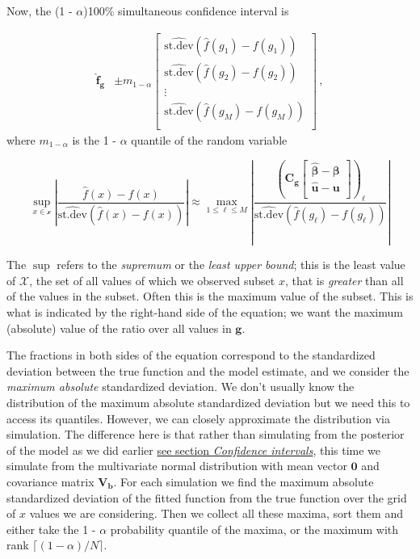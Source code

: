 \documentclass[12pt,]{article}
\begin{document}
Now, the (1 - \(\alpha\))100\% simultaneous confidence interval is

\[
\begin{aligned}
    \hat{\mathbf{f}}_{\mathbf{g}} &\pm m_{1 - \alpha} \begin{bmatrix}
           \widehat{\mathrm{st.dev}} (\hat{f}(g_1) - f(g_1)) \\
           \widehat{\mathrm{st.dev}} (\hat{f}(g_2) - f(g_2)) \\
           \vdots \\
           \widehat{\mathrm{st.dev}} (\hat{f}(g_M) - f(g_M)) \\
         \end{bmatrix}\, ,
\end{aligned}
\] where \(m_{1 - \alpha}\) is the 1 - \(\alpha\) quantile of the random
variable

\[
\sup_{x \in \mathcal{x}} \left | \frac{\hat{f}(x) - f(x)}{\widehat{\mathrm{st.dev}} (\hat{f}(x) - f(x))} \right | \approx \max_{1 \leq \ell \leq M} \left | \frac{\left ( \mathbf{C_g} \begin{bmatrix}
           \boldsymbol{\hat{\beta}} - \boldsymbol{\beta} \\
           \mathbf{\hat{u}} - \mathbf{u} \\
         \end{bmatrix} \right )_\ell}{\widehat{\mathrm{st.dev}} (\hat{f}(g_{\ell}) - f(g_{\ell}))} \right |
\]

The \(\sup\) refers to the \emph{supremum} or the \emph{least upper
bound}; this is the least value of \(\mathcal{X}\), the set of all
values of which we observed subset \(x\), that is \emph{greater} than
all of the values in the subset. Often this is the maximum value of the
subset. This is what is indicated by the right-hand side of the
equation; we want the maximum (absolute) value of the ratio over all
values in \(\mathbf{g}\).

The fractions in both sides of the equation correspond to the
standardized deviation between the true function and the model estimate,
and we consider the \emph{maximum absolute} standardized deviation. We
don't usually know the distribution of the maximum absolute standardized
deviation but we need this to access its quantiles. However, we can
closely approximate the distribution via simulation. The difference here
is that rather than simulating from the posterior of the model as we did
earlier \protect\hyperlink{confint}{see section \emph{Confidence
intervals}}, this time we simulate from the multivariate normal
distribution with mean vector \(\mathbf{0}\) and covariance matrix
\(\mathbf{V_{b}}\). For each simulation we find the maximum absolute
standardized deviation of the fitted function from the true function
over the grid of \(x\) values we are considering. Then we collect all
these maxima, sort them and either take the 1 - \(\alpha\) probability
quantile of the maxima, or the maximum with rank
\(\lceil (1 - \alpha) / N \rceil\).
\end{document}
